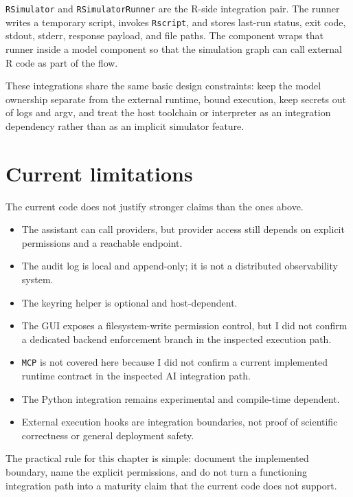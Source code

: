 \texttt{RSimulator} and \texttt{RSimulatorRunner} are the R-side integration pair. The runner writes a temporary script, invokes \texttt{Rscript}, and stores last-run status, exit code, stdout, stderr, response payload, and file paths. The component wraps that runner inside a model component so that the simulation graph can call external R code as part of the flow.

These integrations share the same basic design constraints: keep the model ownership separate from the external runtime, bound execution, keep secrets out of logs and argv, and treat the host toolchain or interpreter as an integration dependency rather than as an implicit simulator feature.

\section{Current limitations}
\label{sec:ai-limitations}

The current code does not justify stronger claims than the ones above.
\begin{itemize}
\item The assistant can call providers, but provider access still depends on explicit permissions and a reachable endpoint.
\item The audit log is local and append-only; it is not a distributed observability system.
\item The keyring helper is optional and host-dependent.
\item The GUI exposes a filesystem-write permission control, but I did not confirm a dedicated backend enforcement branch in the inspected execution path.
\item \texttt{MCP} is not covered here because I did not confirm a current implemented runtime contract in the inspected AI integration path.
\item The Python integration remains experimental and compile-time dependent.
\item External execution hooks are integration boundaries, not proof of scientific correctness or general deployment safety.
\end{itemize}

The practical rule for this chapter is simple: document the implemented boundary, name the explicit permissions, and do not turn a functioning integration path into a maturity claim that the current code does not support.
